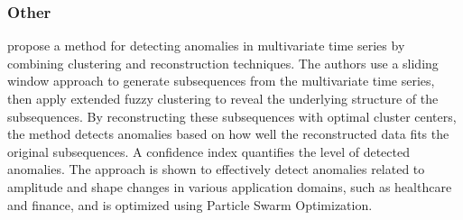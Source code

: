 \subsubsection{Other}
\cite{li_clustering-based_2021} propose a method for detecting anomalies in multivariate time series by combining clustering and reconstruction techniques. The authors use a sliding window approach to generate subsequences from the multivariate time series, then apply extended fuzzy clustering to reveal the underlying structure of the subsequences. By reconstructing these subsequences with optimal cluster centers, the method detects anomalies based on how well the reconstructed data fits the original subsequences. A confidence index quantifies the level of detected anomalies. The approach is shown to effectively detect anomalies related to amplitude and shape changes in various application domains, such as healthcare and finance, and is optimized using Particle Swarm Optimization.


\cite{niu_lstm-based_2020}
\cite{duan_unsupervised_2021}
